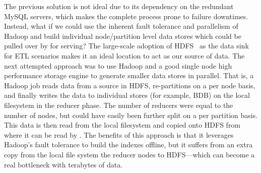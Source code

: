 The previous solution is not ideal due to its dependency on the
redundant MySQL servers, which makes the complete process prone to
failure downtimes. Instead, what if we could use the inherent fault
tolerance and parallelism of Hadoop and build individual
node/partition level data stores which could be pulled over by
\projectname{} for serving? The large-scale adoption of
HDFS~\cite{hdfs} as the data sink for ETL scenarios makes it an ideal
location to act as our source of data. The next attempted approach was
to use Hadoop and a good single node high performance storage engine
to generate smaller data stores in parallel. That is, a Hadoop job
reads data from a source in HDFS, re-partitions on a per node basis,
and finally writes the data to individual stores (for example, BDB) on
the local filesystem in the reducer phase. The number of reducers were
equal to the number of nodes, but could have easily been further split
on a per partition basis. This data is then read from the local
filesystem and copied onto HDFS from where it can be read by
\projectname{}. The benefits of this approach is that it leverages
Hadoop's fault tolerance to build the indexes offline, but it suffers
from an extra copy from the local file system the reducer nodes to
HDFS---which can become a real bottleneck with terabytes of data. 

